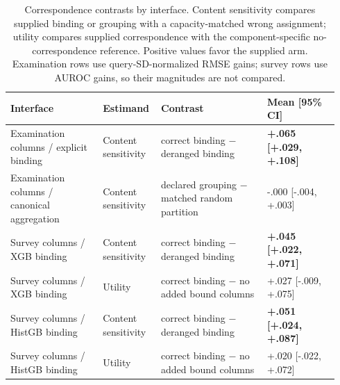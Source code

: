 \begin{table}[H]
\caption{Correspondence contrasts by interface. Content sensitivity compares supplied binding or grouping with a capacity-matched wrong assignment; utility compares supplied correspondence with the component-specific no-correspondence reference. Positive values favor the supplied arm. Examination rows use query-SD-normalized RMSE gains; survey rows use AUROC gains, so their magnitudes are not compared.}
\label{tab:app-correspondence-interfaces}
\centering\scriptsize
\setlength{\tabcolsep}{3pt}
\begin{tabular}{P{0.27\linewidth}P{0.15\linewidth}P{0.31\linewidth}P{0.21\linewidth}}
\toprule Interface & Estimand & Contrast & Mean [95\% CI] \\
\midrule
Examination columns / explicit binding & Content sensitivity & correct binding $-$ deranged binding & \textbf{+.065 [+.029, +.108]} \\
Examination columns / canonical aggregation & Content sensitivity & declared grouping $-$ matched random partition & -.000 [-.004, +.003] \\
Survey columns / XGB binding & Content sensitivity & correct binding $-$ deranged binding & \textbf{+.045 [+.022, +.071]} \\
Survey columns / XGB binding & Utility & correct binding $-$ no added bound columns & +.027 [-.009, +.075] \\
Survey columns / HistGB binding & Content sensitivity & correct binding $-$ deranged binding & \textbf{+.051 [+.024, +.087]} \\
Survey columns / HistGB binding & Utility & correct binding $-$ no added bound columns & +.020 [-.022, +.072] \\
\bottomrule\end{tabular}
\end{table}
